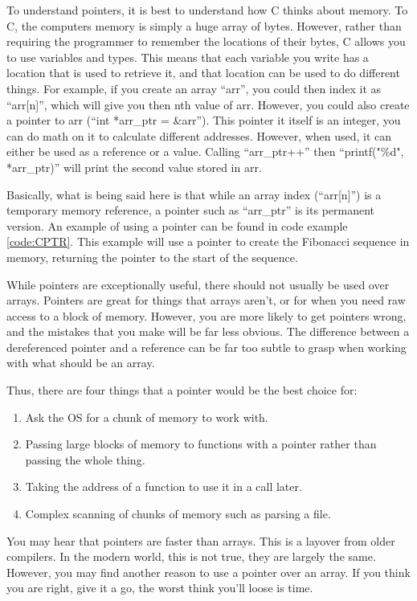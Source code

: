 			To understand pointers, it is best to understand how C thinks about memory. 
			To C, the computers memory is simply a huge array of bytes. 
			However, rather than requiring the programmer to remember the locations of their bytes, C allows you to use variables and types. 
			This means that each variable you write has a location that is used to retrieve it, and that location can be used to do different things. 
			For example, if you create an array ``arr'', you could then index it as ``arr[n]'', which will give you then nth value of arr. 
			However, you could also create a pointer to arr (``int *arr\_ptr = \&arr''). 
			This pointer it itself is an integer, you can do math on it to calculate different addresses. 
			However, when used, it can either be used as a reference or a value. 
			Calling ``arr\_ptr++'' then ``printf("\%d", *arr\_ptr)'' will print the second value stored in arr. 

			Basically, what is being said here is that while an array index (``arr[n]'') is a temporary memory reference, a pointer such as ``arr\_ptr'' is its permanent version. 
			An example of using a pointer can be found in code example \ref{code:CPTR}. 
			This example will use a pointer to create the Fibonacci sequence in memory, returning the pointer to the start of the sequence. 
			\begin{code}
				C}]{./CPointers.c}
				\caption{Example of a C Pointers}
				\label{code:CPTR}
			\end{code}

			While pointers are exceptionally useful, there should not usually be used over arrays. 
			Pointers are great for things that arrays aren't, or for when you need raw access to a block of memory. 
			However, you are more likely to get pointers wrong, and the mistakes that you make will be far less obvious. 
			The difference between a dereferenced pointer and a reference can be far too subtle to grasp when working with what should be an array. 

			Thus, there are four things that a pointer would be the best choice for:
			\begin{enumerate}
				\item Ask the OS for a chunk of memory to work with. 
				\item Passing large blocks of memory to functions with a pointer rather than passing the whole thing. 
				\item Taking the address of a function to use it in a call later. 
				\item Complex scanning of chunks of memory such as parsing a file. 
			\end{enumerate}
			You may hear that pointers are faster than arrays. 
			This is a layover from older compilers. 
			In the modern world, this is not true, they are largely the same. 
			However, you may find another reason to use a pointer over an array. 
			If you think you are right, give it a go, the worst think you'll loose is time. 

